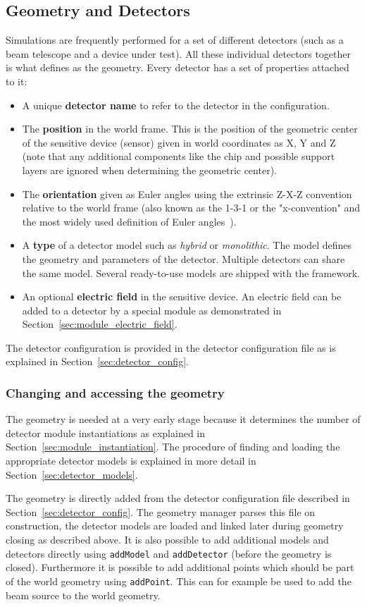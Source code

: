 \subsection{Geometry and Detectors}
\label{sec:models_geometry}
Simulations are frequently performed for a set of different detectors (such as a beam telescope and a device under test).
All these individual detectors together is what \apsq defines as the geometry.
Every detector has a set of properties attached to it:
\begin{itemize}
\item A unique \textbf{detector name} to refer to the detector in the configuration.
\item The \textbf{position} in the world frame.
This is the position of the geometric center of the sensitive device (sensor) given in world coordinates as X, Y and Z (note that any additional components like the chip and possible support layers are ignored when determining the geometric center).
\item The \textbf{orientation} given as Euler angles using the extrinsic Z-X-Z convention relative to the world frame (also known as the 1-3-1 or the "x-convention" and the most widely used definition of Euler angles~\cite{eulerangles}).
\item A \textbf{type} of a detector model such as \emph{hybrid} or \emph{monolithic}.
The model defines the geometry and parameters of the detector.
Multiple detectors can share the same model.
Several ready-to-use models are shipped with the framework.
\item An optional \textbf{electric field} in the sensitive device.
An electric field can be added to a detector by a special module as demonstrated in Section~\ref{sec:module_electric_field}.
\end{itemize}
The detector configuration is provided in the detector configuration file as is explained in Section~\ref{sec:detector_config}.

\subsubsection{Changing and accessing the geometry}
The geometry is needed at a very early stage because it determines the number of detector module instantiations as explained in Section~\ref{sec:module_instantiation}.
The procedure of finding and loading the appropriate detector models is explained in more detail in Section~\ref{sec:detector_models}.

The geometry is directly added from the detector configuration file described in Section~\ref{sec:detector_config}.
The geometry manager parses this file on construction, the detector models are loaded and linked later during geometry closing as described above.
It is also possible to add additional models and detectors directly using \texttt{addModel} and \texttt{addDetector} (before the geometry is closed).
Furthermore it is possible to add additional points which should be part of the world geometry using \texttt{addPoint}.
This can for example be used to add the beam source to the world geometry.

